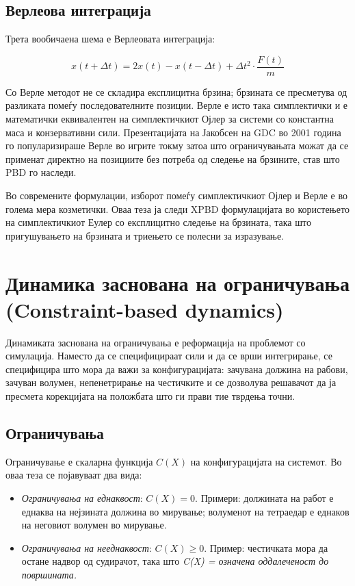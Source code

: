 \subsection{Верлеова интеграција}
Трета вообичаена шема е Верлеовата интеграција:

$$x(t + \Delta t) = 2x(t) - x(t - \Delta t) + \Delta t^2 \cdot \frac{F(t)}{m}$$

Со Верле методот не се складира експлицитна брзина; брзината се пресметува од разликата помеѓу последователните позиции. Верле е исто така симплектички и е математички еквивалентен на симплектичкиот Ојлер за системи со константна маса и конзервативни сили. Презентацијата на Јакобсен на GDC во 2001 година го популаризираше Верле во игрите токму затоа што ограничувањата можат да се применат директно на позициите без потреба од следење на брзините, став што PBD го наследи.

Во современите формулации, изборот помеѓу симплектичкиот Ојлер и Верле е во голема мера козметички. Оваа теза ја следи XPBD формулацијата \cite{macklin2016xpbd} во користењето на симплектичкиот Еулер со експлицитно следење на брзината, така што пригушувањето на брзината и триењето се полесни за изразување.


\section{Динамика заснована на ограничувања (Constraint-based dynamics)}
Динамиката заснована на ограничувања е реформација на проблемот со симулација. Наместо да се специфицираат сили и да се врши интегрирање, се специфицира што мора да важи за конфигурацијата: зачувана должина на рабови, зачуван волумен, непенетрирање на честичките и се дозволува решавачот да ја пресмета корекцијата на положбата што ги прави тие тврдења точни.

\subsection{Ограничувања}
Ограничување е скаларна функција $C(X)$ на конфигурацијата на системот. Во оваа теза се појавуваат два вида:
\begin{itemize}
	\item \textit{Ограничувања на еднаквост}: $C(X) = 0$. Примери: должината на работ е еднаква на нејзината должина во мирување; волуменот на тетраедар е еднаков на неговиот волумен во мирување.
	\item \textit{Ограничувања на нееднаквост}: $C(X) \geq 0$. Пример: честичката мора да остане надвор од судирачот, така што \textit{C(X) = означена оддалеченост до површината.}
\end{itemize}


